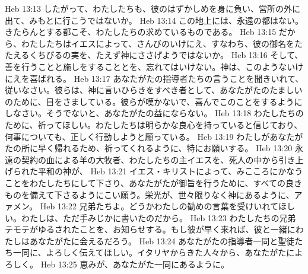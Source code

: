 Heb 13:13  したがって、わたしたちも、彼のはずかしめを身に負い、営所の外に出て、みもとに行こうではないか。
Heb 13:14  この地上には、永遠の都はない。きたらんとする都こそ、わたしたちの求めているものである。
Heb 13:15  だから、わたしたちはイエスによって、さんびのいけにえ、すなわち、彼の御名をたたえるくちびるの実を、たえず神にささげようではないか。
Heb 13:16  そして、善を行うことと施しをすることとを、忘れてはいけない。神は、このようないけにえを喜ばれる。
Heb 13:17  あなたがたの指導者たちの言うことを聞きいれて、従いなさい。彼らは、神に言いひらきをすべき者として、あなたがたのたましいのために、目をさましている。彼らが嘆かないで、喜んでこのことをするようにしなさい。そうでないと、あなたがたの益にならない。
Heb 13:18  わたしたちのために、祈ってほしい。わたしたちは明らかな良心を持っていると信じており、何事についても、正しく行動しようと願っている。
Heb 13:19  わたしがあなたがたの所に早く帰れるため、祈ってくれるように、特にお願いする。
Heb 13:20  永遠の契約の血による羊の大牧者、わたしたちの主イエスを、死人の中から引き上げられた平和の神が、
Heb 13:21  イエス・キリストによって、みこころにかなうことをわたしたちにして下さり、あなたがたが御旨を行うために、すべての良きものを備えて下さるようにこい願う。栄光が、世々限りなく神にあるように、アァメン。
Heb 13:22  兄弟たちよ。どうかわたしの勧めの言葉を受けいれてほしい。わたしは、ただ手みじかに書いたのだから。
Heb 13:23  わたしたちの兄弟テモテがゆるされたことを、お知らせする。もし彼が早く来れば、彼と一緒にわたしはあなたがたに会えるだろう。
Heb 13:24  あなたがたの指導者一同と聖徒たち一同に、よろしく伝えてほしい。イタリヤからきた人々から、あなたがたによろしく。
Heb 13:25  恵みが、あなたがた一同にあるように。


